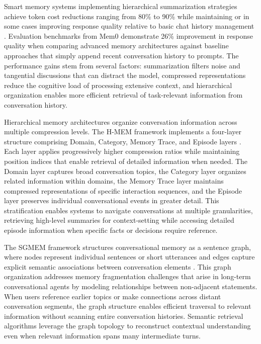 Smart memory systems implementing hierarchical summarization strategies achieve token cost reductions ranging from 80\% to 90\% while maintaining or in some cases improving response quality relative to basic chat history management \citep{mem0ai2025guide}. Evaluation benchmarks from Mem0 demonstrate 26\% improvement in response quality when comparing advanced memory architectures against baseline approaches that simply append recent conversation history to prompts. The performance gains stem from several factors: summarization filters noise and tangential discussions that can distract the model, compressed representations reduce the cognitive load of processing extensive context, and hierarchical organization enables more efficient retrieval of task-relevant information from conversation history.

Hierarchical memory architectures organize conversation information across multiple compression levels. The H-MEM framework implements a four-layer structure comprising Domain, Category, Memory Trace, and Episode layers \citep{wang2024hmem}. Each layer applies progressively higher compression ratios while maintaining position indices that enable retrieval of detailed information when needed. The Domain layer captures broad conversation topics, the Category layer organizes related information within domains, the Memory Trace layer maintains compressed representations of specific interaction sequences, and the Episode layer preserves individual conversational events in greater detail. This stratification enables systems to navigate conversations at multiple granularities, retrieving high-level summaries for context-setting while accessing detailed episode information when specific facts or decisions require reference.

The SGMEM framework structures conversational memory as a sentence graph, where nodes represent individual sentences or short utterances and edges capture explicit semantic associations between conversation elements \citep{liu2024sgmem}. This graph organization addresses memory fragmentation challenges that arise in long-term conversational agents by modeling relationships between non-adjacent statements. When users reference earlier topics or make connections across distant conversation segments, the graph structure enables efficient traversal to relevant information without scanning entire conversation histories. Semantic retrieval algorithms leverage the graph topology to reconstruct contextual understanding even when relevant information spans many intermediate turns.

